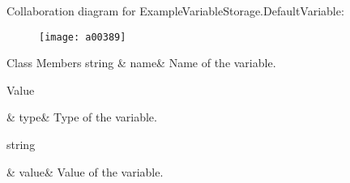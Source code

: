 Collaboration diagram for Example\-Variable\-Storage.\-Default\-Variable\-:
\nopagebreak
\begin{figure}[H]
\begin{center}
\leavevmode
\texttt{[image: a00389]}
\end{center}
\end{figure}
\begin{DoxyFields}{Class Members}
\hypertarget{a00091_a609feaa53936e7dc42248ff2ba68454a}{string}\label{a00091_a609feaa53936e7dc42248ff2ba68454a}
&
name&
Name of the variable. \\
\hline

\hypertarget{a00091_a904347efdca12f40243c7dedb646153d}{Value}\label{a00091_a904347efdca12f40243c7dedb646153d}
&
type&
Type of the variable. \\
\hline

\hypertarget{a00091_a0f00ecb21b58aa754a4bbb61edf62818}{string}\label{a00091_a0f00ecb21b58aa754a4bbb61edf62818}
&
value&
Value of the variable. \\
\hline

\end{DoxyFields}
